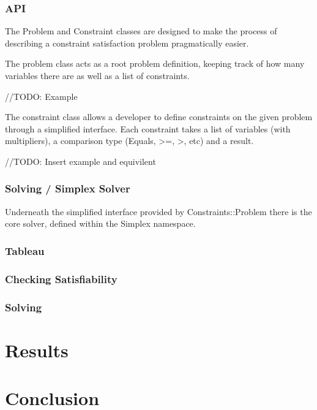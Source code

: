 \documentclass{report}
\begin{document}

\subsection {API}
The Problem and Constraint classes are designed to make the process of describing a constraint satisfaction problem pragmatically easier.

The problem class acts as a root problem definition, keeping track of how many variables there are as well as a list of constraints.

//TODO: Example

The constraint class allows a developer to define constraints on the given problem through a simplified interface. Each constraint takes a list of variables (with multipliers), a comparison type (Equals, >=, >, etc) and a result.

//TODO: Insert example and equivilent

\subsection {Solving / Simplex Solver}

Underneath the simplified interface provided by Constraints::Problem there is the core solver, defined within the Simplex namespace.

\subsection {Tableau}
\subsection {Checking Satisfiability}
\subsection {Solving}

\chapter {Results}
\chapter {Conclusion}
\end{document}
